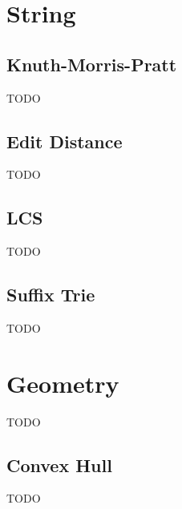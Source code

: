 \documentclass[twocolumn,8pt]{article}
\begin{document}
\section{String}

\subsection{Knuth-Morris-Pratt}
TODO

\subsection{Edit Distance}
TODO

\subsection{LCS}
TODO

\subsection{Suffix Trie}
TODO


\section{Geometry}

TODO

\subsection{Convex Hull}

TODO
\end{document}
